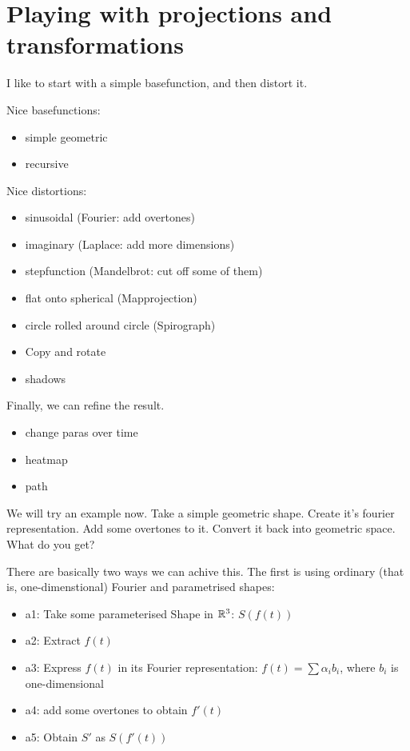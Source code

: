 \section{Playing with projections and transformations}

I like to start with a simple basefunction, and then distort it.

Nice basefunctions:
\begin{itemize}
    \item simple geometric
    \item recursive
\end{itemize}

Nice distortions: 
\begin{itemize}
    \item sinusoidal (Fourier: add overtones)
    \item imaginary (Laplace: add more dimensions)
    \item stepfunction (Mandelbrot: cut off some of them)
    \item flat onto spherical (Mapprojection)
    \item circle rolled around circle (Spirograph)
    \item Copy and rotate
    \item shadows
\end{itemize}

Finally, we can refine the result. 
\begin{itemize}
    \item change paras over time
    \item heatmap
    \item path
\end{itemize}

We will try an example now. Take a simple geometric shape. Create it's fourier representation. Add some overtones to it. Convert it back into geometric space. What do you get?

There are basically two ways we can achive this. The first is using ordinary (that is, one-dimenstional) Fourier and parametrised shapes: 
\begin{itemize}
    \item a1: Take some parameterised Shape in $\mathbb{R}^3$: $S(f(t))$
    \item a2: Extract $f(t)$
    \item a3: Express $f(t)$ in its Fourier representation: $f(t) = \sum \alpha_i b_i$, where $b_i$ is one-dimensional
    \item a4: add some overtones to obtain $f'(t)$
    \item a5: Obtain $S'$ as $S(f'(t))$ 
\end{itemize}


